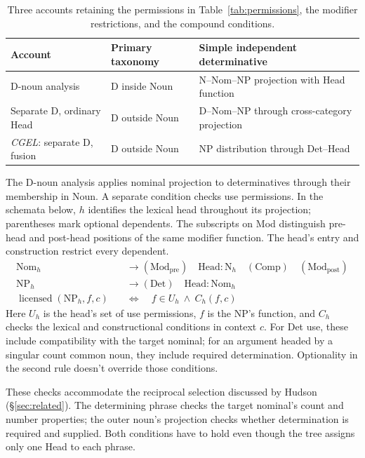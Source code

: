\documentclass[12pt]{article}
\begin{document}
\begin{table}[H]
\centering\small
\caption{Three accounts retaining the permissions in Table~\ref{tab:permissions}, the modifier restrictions, and the compound conditions.}\label{tab:economy}
\begin{tabular}{>{\raggedright\arraybackslash}p{3.1cm}>{\raggedright\arraybackslash}p{3.9cm}>{\raggedright\arraybackslash}p{4.7cm}}
\toprule
Account & Primary taxonomy & Simple independent determinative \\
\midrule
D-noun analysis & D inside Noun & N--Nom--NP projection with Head function \\
Separate D, ordinary Head & D outside Noun & D--Nom--NP through cross-category projection \\
\textit{CGEL}: separate D, fusion & D outside Noun & NP distribution through Det--Head \\
\bottomrule
\end{tabular}
\end{table}

The D-noun analysis applies nominal projection to determinatives through their membership in Noun. A separate condition checks use permissions. In the schemata below, $h$ identifies the lexical head throughout its projection; parentheses mark optional dependents. The subscripts on Mod distinguish pre-head and post-head positions of the same modifier function. The head's entry and construction restrict every dependent.
\[
\begin{aligned}
\mathrm{Nom}_{h} &\to (\mathrm{Mod}_{\mathrm{pre}})\quad \mathrm{Head}:\mathrm{N}_{h}\quad (\mathrm{Comp})\quad (\mathrm{Mod}_{\mathrm{post}}) \\
\mathrm{NP}_{h} &\to (\mathrm{Det})\quad \mathrm{Head}:\mathrm{Nom}_{h} \\
\operatorname{licensed}(\mathrm{NP}_{h},f,c)\quad &\Longleftrightarrow\quad f\in U_h\ \land\ C_h(f,c)
\end{aligned}
\]
Here $U_h$ is the head's set of use permissions, $f$ is the NP's function, and $C_h$ checks the lexical and constructional conditions in context $c$. For Det use, these include compatibility with the target nominal; for an argument headed by a singular count common noun, they include required determination. Optionality in the second rule doesn't override those conditions.

These checks accommodate the reciprocal selection discussed by Hudson (§\ref{sec:related}). The determining phrase checks the target nominal's count and number properties; the outer noun's projection checks whether determination is required and supplied. Both conditions have to hold even though the tree assigns only one Head to each phrase.
\end{document}
